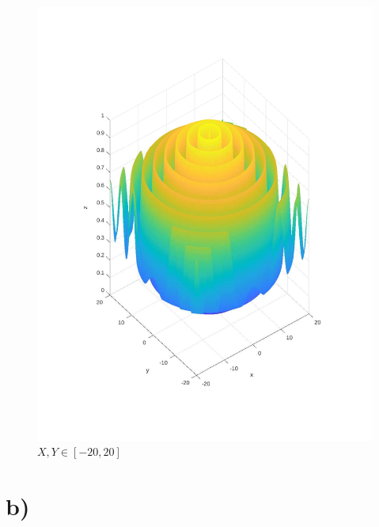 \documentclass{article}
\begin{document}
\begin{figure}[h!]
\centering
\includegraphics[scale=.5]{images/myplot5c.pdf}
\caption{$X,Y \in [-20, 20]$}
\label{fig:plot5c_f6}
\end{figure}

\newpage
\section*{b)}
\end{document}
